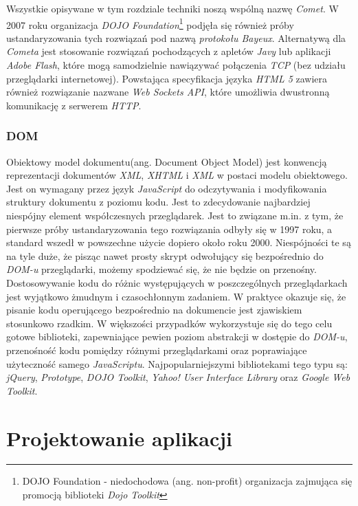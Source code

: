 \documentclass[a4paper,12pt]{article}
\begin{document}
Wszystkie opisywane w tym rozdziale techniki noszą wspólną nazwę
\emph{Comet}\cite{comet}. W 2007 roku organizacja \emph{DOJO
  Foundation}\footnote{DOJO Foundation - niedochodowa
  (ang. non-profit) organizacja zajmująca się promocją biblioteki
  \emph{Dojo Toolkit}\cite{dojo}} podjęła się również próby
ustandaryzowania tych rozwiązań pod nazwą \emph{protokołu
  Bayeux}\cite{bayeux}. Alternatywą dla \emph{Cometa} jest stosowanie
rozwiązań pochodzących z apletów \emph{Javy} lub aplikacji \emph{Adobe
  Flash}, które mogą samodzielnie nawiązywać połączenia \emph{TCP}
(bez udziału przeglądarki internetowej). Powstająca specyfikacja
języka \emph{HTML 5} zawiera również rozwiązanie nazwane \emph{Web
  Sockets API}, które umożliwia dwustronną komunikację z serwerem
\emph{HTTP}\cite{websockets}.

\subsubsection{DOM}
Obiektowy model dokumentu(ang. Document Object Model) jest konwencją
reprezentacji dokumentów \emph{XML}, \emph{XHTML} i \emph{XML} w
postaci modelu obiektowego. Jest on wymagany przez język
\emph{JavaScript} do odczytywania i modyfikowania struktury dokumentu
z poziomu kodu\cite{dom}. Jest to zdecydowanie najbardziej niespójny
element współczesnych przeglądarek. Jest to związane m.in. z tym, że
pierwsze próby ustandaryzowania tego rozwiązania odbyły się w 1997
roku, a standard wszedł w powszechne użycie dopiero około roku
2000. Niespójności te są na tyle duże, że pisząc nawet prosty skrypt
odwołujący się bezpośrednio do \emph{DOM-u} przeglądarki, możemy
spodziewać się, że nie będzie on przenośny. Dostosowywanie kodu do
różnic występujących w poszczególnych przeglądarkach jest wyjątkowo
żmudnym i czasochłonnym zadaniem. W praktyce okazuje się, że pisanie
kodu operującego bezpośrednio na dokumencie jest zjawiskiem stosunkowo
rzadkim. W większości przypadków wykorzystuje się do tego celu gotowe
biblioteki, zapewniające pewien poziom abstrakcji w dostępie do
\emph{DOM-u}, przenośność kodu pomiędzy różnymi przeglądarkami oraz
poprawiające użyteczność samego
\emph{JavaScriptu}. Najpopularniejszymi bibliotekami tego typu są:
\emph{jQuery}, \emph{Prototype}, \emph{DOJO Toolkit}, \emph{Yahoo!
  User Interface Library} oraz \emph{Google Web Toolkit}.

\clearpage

\section{Projektowanie aplikacji}
\end{document}
